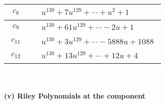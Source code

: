 \documentclass[1p]{elsarticle_modified}
\theoremstyle{definition}
\begin{document}
\begin{tabular}{m{50pt}|m{274pt}}
\hline $$\begin{aligned}c_{8}\end{aligned}$$&$\begin{aligned}
&u^{130}+7 u^{129}+\cdots+u^2+1
\end{aligned}$\\
\hline $$\begin{aligned}c_{9}\end{aligned}$$&$\begin{aligned}
&u^{130}+61 u^{129}+\cdots-2 u+1
\end{aligned}$\\
\hline $$\begin{aligned}c_{11}\end{aligned}$$&$\begin{aligned}
&u^{130}+3 u^{129}+\cdots-5888 u+1088
\end{aligned}$\\
\hline $$\begin{aligned}c_{12}\end{aligned}$$&$\begin{aligned}
&u^{130}+13 u^{129}+\cdots+12 u+4
\end{aligned}$\\
\hline
\end{tabular}\\~\\
\newpage\renewcommand{\arraystretch}{1}
\flushleft \textbf{(v) Riley Polynomials at the component}\newline \\
\end{document}
